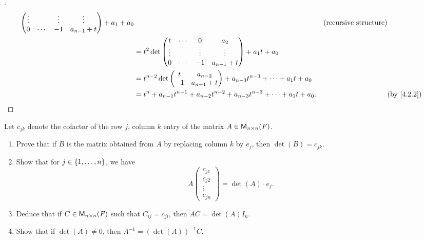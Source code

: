 \begin{proof}[]
\begin{align*}
{\begin{pmatrix}
				                 \vdots &        & \vdots & \vdots        \\
				                 0      & \cdots & -1     & a_{n - 1} + t
			                 \end{pmatrix} + a_1} + a_0                                                     &  & \text{(recursive structure)} \\
		 & = t^2 \det\begin{pmatrix}
			             t      & \cdots & 0      & a_2           \\
			             \vdots &        & \vdots & \vdots        \\
			             0      & \cdots & -1     & a_{n - 1} + t
		             \end{pmatrix} + a_1 t + a_0                                                                             \\
		 & = t^{n - 2} \det\begin{pmatrix}
			                   t  & a_{n - 2}     \\
			                   -1 & a_{n - 1} + t
		                   \end{pmatrix} + a_{n - 3} t^{n - 3} + \cdots + a_1 t + a_0                                                     \\
		 & = t^n + a_{n - 1} t^{n - 1} + a_{n - 2} t^{n - 2} + a_{n - 3} t^{n - 3} + \cdots + a_1 t + a_0. &  & \by{4.2.2}
	\end{align*}
\end{proof}

\begin{ex}\label{ex:4.3.25}
	Let \(c_{j k}\) denote the cofactor of the row \(j\), column \(k\) entry of the matrix \(A \in \ms[n][n][\F]\).
	\begin{enumerate}
		\item Prove that if \(B\) is the matrix obtained from \(A\) by replacing column \(k\) by \(e_j\), then \(\det(B) = c_{j k}\).
		\item Show that for \(j \in \left\lbrace1, \dots, n\right\rbrace\), we have
		      \[
			      A \begin{pmatrix}
				      c_{j 1} \\
				      c_{j 2} \\
				      \vdots  \\
				      c_{j n}
			      \end{pmatrix} = \det(A) \cdot e_j.
		      \]
		\item Deduce that if \(C \in \ms[n][n][\F]\) such that \(C_{i j} = c_{j i}\), then \(AC = \det(A) I_n\).
		\item Show that if \(\det(A) \neq 0\), then \(A^{-1} = (\det(A))^{-1} C\).
	\end{enumerate}
\end{ex}

